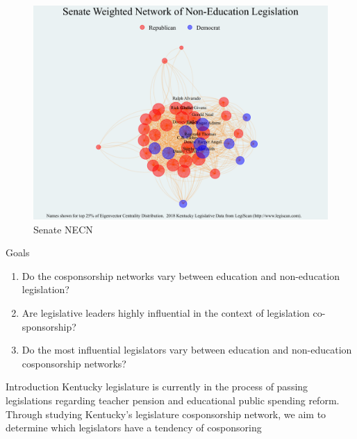 \documentclass[final]{beamer}
\newlength{\onecolwid}
\begin{document}
\begin{frame}[t]
\begin{columns}[t]
			\begin{column}{\onecolwid} 
				\begin{figure}
					\includegraphics[scale=0.95]{senatenonedwgt-graph.pdf}
					\caption{Senate NECN \label{senatenoned}}
				\end{figure}
				\begin{block}{Goals}
					\begin{enumerate}
						\item{Do the cosponsorship networks vary between education and non-education legislation?} 
					   \item{Are legislative leaders highly influential in the context of legislation co-sponsorship?}
					   \item{Do the most influential legislators vary between education and non-education cosponsorship networks?}
					\end{enumerate}
				\end{block}
				\begin{block}{Introduction}
					Kentucky legislature is currently in the process of passing legislations regarding teacher 
					pension and educational public spending reform.   Through studying Kentucky's legislature 
					cosponsorship network, we aim to determine which legislators have a tendency of cosponsoring 

\end{block}
\end{column}
\end{columns}
\end{frame}
\end{document}
